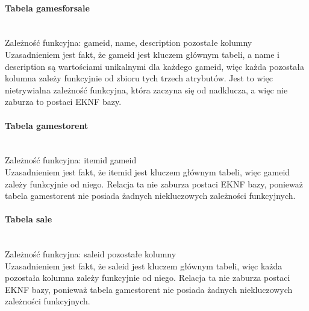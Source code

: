 \documentclass{article}
\begin{document}
	\paragraph{Tabela games\textunderscore for\textunderscore sale}\mbox{}\vspace{0.2cm} \\
	Zależność funkcyjna: \textbraceleft game\textunderscore id, name, description\textbraceright \mbox{} \textrightarrow \mbox{} pozostałe kolumny \vspace{0.2cm} \\
	\noindent Uzasadnieniem jest fakt, że game\textunderscore id jest kluczem głównym tabeli, a name i description są wartościami unikalnymi dla każdego game\textunderscore id, więc każda pozostała kolumna zależy funkcyjnie od zbioru tych trzech atrybutów. Jest to więc nietrywialna zależność funkcyjna, która zaczyna się od nadklucza, a więc nie zaburza to postaci EKNF bazy.

	\paragraph{Tabela games\textunderscore to\textunderscore rent}\mbox{}\vspace{0.2cm} \\
	Zależność funkcyjna: item\textunderscore id\mbox{} \textrightarrow \mbox{} game\textunderscore id \vspace{0.2cm} \\
	\noindent Uzasadnieniem jest fakt, że item\textunderscore id jest kluczem głównym tabeli, więc game\textunderscore id zależy funkcyjnie od niego. Relacja ta nie zaburza postaci EKNF bazy, ponieważ tabela games\textunderscore to\textunderscore rent nie posiada żadnych niekluczowych zależności funkcyjnych.
	
	\paragraph{Tabela sale}\mbox{}\vspace{0.2cm} \\
	Zależność funkcyjna: sale\textunderscore id\mbox{} \textrightarrow \mbox{} pozostałe kolumny \vspace{0.2cm} \\
	\noindent Uzasadnieniem jest fakt, że sale\textunderscore id jest kluczem głównym tabeli, więc każda pozostała kolumna zależy funkcyjnie od niego. Relacja ta nie zaburza postaci EKNF bazy, ponieważ tabela games\textunderscore to\textunderscore rent nie posiada żadnych niekluczowych zależności funkcyjnych.
	
\end{document}
